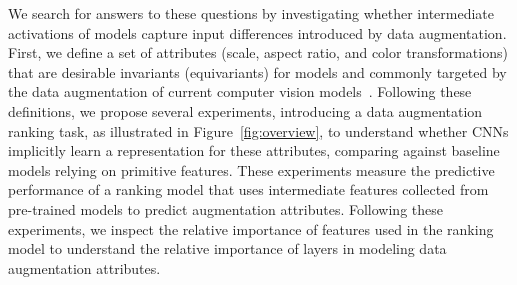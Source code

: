 

We search for answers to these questions by investigating whether intermediate activations of models capture input differences introduced by data augmentation.
First, we define a set of attributes (scale, aspect ratio, and color transformations) that are desirable invariants (equivariants) for models and commonly targeted by the data augmentation of current computer vision models~\cite{cubuk2019autoaugment}.
Following these definitions, 
we propose several experiments, introducing a data augmentation ranking task, as illustrated in Figure~\ref{fig:overview}, to understand whether CNNs implicitly learn a representation for these attributes, comparing against baseline models relying on primitive features.
These experiments measure the predictive performance of a ranking model that uses intermediate features collected from pre-trained models to predict augmentation attributes. Following these experiments, we inspect the relative importance of features used in the ranking model to understand the relative importance of layers in modeling data augmentation attributes.

